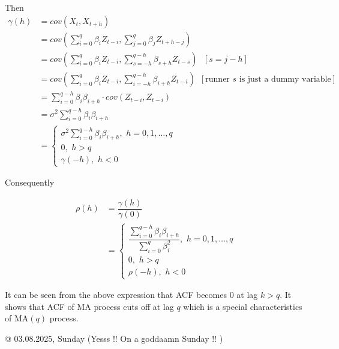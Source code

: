 \documentclass[11pt, a4paper]{article}
\begin{document}
Then
\begin{align*}
\gamma(h) &= cov(X_t, X_{t+h}) \\[0.25em]
&= cov \left(\sum \limits_{i = 0}^{q} \beta_i Z_{t-i}, \sum \limits_{j = 0}^{q} \beta_j Z_{t+h-j} \right) \\[0.25em]
&= cov \left(\sum \limits_{i = 0}^{q} \beta_i Z_{t-i}, \sum \limits_{s = -h}^{q-h} \beta_{s+h} Z_{t-s} \right) \,\,\,\, [s = j-h] \\[0.25em]
&= cov \left(\sum \limits_{i = 0}^{q} \beta_i Z_{t-i}, \sum \limits_{i = -h}^{q-h} \beta_{i+h} Z_{t-i} \right) \,\,\, [\text{runner } s \text{ is just a dummy variable}]\\[0.25em]
&= \sum \limits_{i = 0}^{q - h} \beta_{i}\beta_{i+h} \cdot cov(Z_{t-i}, Z_{t-i}) \\[0.25em]
&= \sigma^2 \sum \limits_{i = 0}^{q - h} \beta_{i}\beta_{i+h} \\[0.25em]
&= \begin{cases}
\sigma^2 \sum \limits_{i = 0}^{q - h} \beta_{i}\beta_{i+h}, \,\, h = 0, 1, \ldots, q \\[0.25em]
0, \,\, h > q \\[0.5em]
\gamma(-h), \,\, h < 0
\end{cases}
\end{align*}

\vspace{0.25cm}

Consequently

\begin{align*}
\rho(h) &= \dfrac{\gamma(h)}{\gamma(0)} \\[0.35em]
&= \begin{cases} 
\dfrac{\sum \limits_{i = 0}^{q - h} \beta_{i}\beta_{i+h}}{\sum \limits_{i = 0}^{q} \beta_{i}^{2}}, \,\, h = 0, 1, \ldots, q \\[1em]
0, \,\, h > q \\[0.5em]
\rho(-h), \,\, h < 0
\end{cases}
\end{align*}

\smallpencil \hspace{0.1cm} It can be seen from the above expression that ACF becomes $0$ at lag $k > q$. It shows that ACF of MA process cuts off at lag $q$ which is a special characteristics of MA$(q)$ process.

\vspace{0.5cm}

\begin{flushright}
\textcolor{col2}{@ 03.08.2025, Sunday (Yesss !! On a goddaamn Sunday !! )}
\end{flushright}
\end{document}
